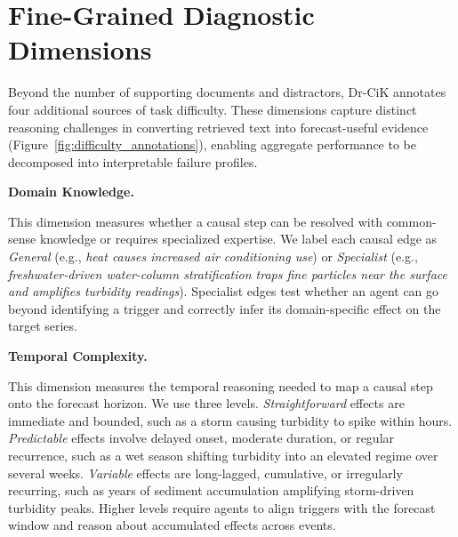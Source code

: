 \documentclass[]{servicenow}
\newcommand{\paragraphtight}[1]{%
  \par\vspace{-0.75\parskip}\vspace{0.3em}%
  \noindent\textbf{#1}\hspace{0.4em}\ignorespaces
}
\begin{document}























\section{Fine-Grained Diagnostic Dimensions}
\label{appendix:difficulty}

Beyond the number of supporting documents and distractors, Dr-CiK annotates four additional sources of task difficulty. 
These dimensions capture distinct reasoning challenges in converting retrieved text into forecast-useful evidence (Figure~\ref{fig:difficulty_annotations}), enabling aggregate performance to be decomposed into interpretable failure profiles.

\paragraphtight{Domain Knowledge.}
This dimension measures whether a causal step can be resolved with common-sense knowledge or requires specialized expertise. 
We label each causal edge as \emph{General} (e.g., \emph{heat causes increased air conditioning use}) or \emph{Specialist} (e.g., \emph{freshwater-driven water-column stratification traps fine particles near the surface and amplifies turbidity readings}). 
Specialist edges test whether an agent can go beyond identifying a trigger and correctly infer its domain-specific effect on the target series.

\paragraphtight{Temporal Complexity.}
This dimension measures the temporal reasoning needed to map a causal step onto the forecast horizon. 
We use three levels. 
\emph{Straightforward} effects are immediate and bounded, such as a storm causing turbidity to spike within hours. 
\emph{Predictable} effects involve delayed onset, moderate duration, or regular recurrence, such as a wet season shifting turbidity into an elevated regime over several weeks. 
\emph{Variable} effects are long-lagged, cumulative, or irregularly recurring, such as years of sediment accumulation amplifying storm-driven turbidity peaks. 
Higher levels require agents to align triggers with the forecast window and reason about accumulated effects across events.
\end{document}

